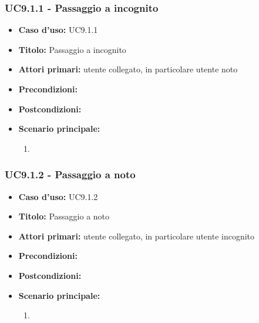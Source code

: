 \documentclass[casi-duso]{subfiles}
\begin{document}
\subsubsection{UC9.1.1 - Passaggio a incognito}
\label{subsub:uc9.1.1utente}
\begin{itemize}
  \item \textbf{Caso d’uso:} UC9.1.1
  \item \textbf{Titolo:} Passaggio a incognito
  \item \textbf{Attori primari:} utente collegato, in particolare utente noto
  \item \textbf{Precondizioni:} 
  \item \textbf{Postcondizioni:}
  \item \textbf{Scenario principale:} 
  \begin{enumerate}
    \item 
  \end{enumerate}
\end{itemize}

\subsubsection{UC9.1.2 - Passaggio a noto}
\label{subsub:uc9.1.2utente}
\begin{itemize}
  \item \textbf{Caso d’uso:} UC9.1.2
  \item \textbf{Titolo:} Passaggio a noto
  \item \textbf{Attori primari:} utente collegato, in particolare utente incognito
  \item \textbf{Precondizioni:} 
  \item \textbf{Postcondizioni:}
  \item \textbf{Scenario principale:} 
  \begin{enumerate}
    \item 
  \end{enumerate}
\end{itemize}

\end{document}
